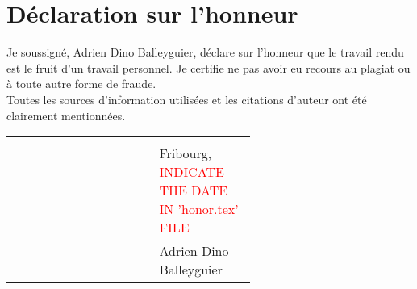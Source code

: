 \section*{Déclaration sur l'honneur}
Je soussigné, Adrien Dino Balleyguier, déclare sur l'honneur que le travail rendu est le fruit d'un travail personnel. Je certifie ne pas avoir eu recours au plagiat ou à toute autre forme de fraude.\\
Toutes les sources d'information utilisées et les citations d'auteur ont été clairement mentionnées.
\begin{center}
    \begin{tabularx}{\linewidth}{p{0.2\linewidth}Xp{0.4\linewidth}}
        &&\\
        &&Fribourg, \textcolor{red}{INDICATE THE DATE IN 'honor.tex' FILE}\\
        &&Adrien Dino Balleyguier\\
    \end{tabularx}
\end{center}
